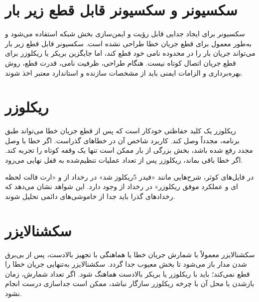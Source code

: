 \documentclass[11pt,a4paper,oneside]{book}
\newcommand{\file}[1]{\lr{\texttt{#1}}}
\begin{document}
\section{سکسیونر و سکسیونر قابل قطع زیر بار}
سکسیونر برای ایجاد جدایی قابل رؤیت و ایمن‌سازی بخش شبکه استفاده می‌شود و به‌طور معمول برای قطع جریان خطا طراحی نشده است. سکسیونر قابل قطع زیر بار می‌تواند جریان بار را در محدوده نامی خود قطع کند، اما جایگزین بریکر یا ریکلوزر برای قطع جریان اتصال کوتاه نیست. هنگام طراحی، ظرفیت نامی، قدرت قطع، روش بهره‌برداری و الزامات ایمنی باید از مشخصات سازنده و استاندارد معتبر اخذ شوند.

\section{ریکلوزر}
ریکلوزر یک کلید حفاظتی خودکار است که پس از قطع جریان خطا می‌تواند طبق برنامه، مجدداً وصل کند. کاربرد شاخص آن در خطاهای گذراست. اگر خطا با وصل مجدد رفع شده باشد، بخش بزرگی از بار ممکن است تنها یک وقفه کوتاه را تجربه کند. اگر خطا باقی بماند، ریکلوزر پس از تعداد عملیات تنظیم‌شده به قفل نهایی می‌رود.

در فایل‌های کوثر، شرح‌هایی مانند «فیدر 5ریکلوز شد» در رخداد  از \file{5.xlsx} و «ارت فالت لحظه ای و عملکرد موفق ریکلوزر» در رخداد  از \file{6.xlsx} وجود دارد. این شواهد نشان می‌دهد که رخدادهای گذرا باید جدا از خاموشی‌های دائمی تحلیل شوند.

\section{سکشنالایزر}
سکشنالایزر معمولاً با شمارش جریان خطا یا هماهنگی با تجهیز بالادست، پس از بی‌برق شدن مدار باز می‌شود تا بخش معیوب جدا گردد. سکشنالایزر به‌تنهایی جریان خطا را قطع نمی‌کند؛ باید با ریکلوزر یا بریکر بالادست هماهنگ شود. اگر تعداد شمارش، زمان بازشدن یا محل آن با چرخه ریکلوزر سازگار نباشد، ممکن است جداسازی درست انجام نشود.
\end{document}
